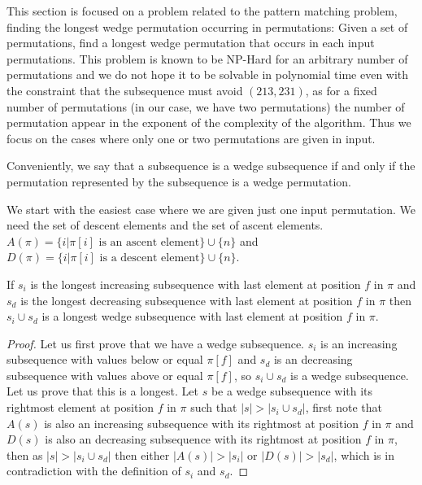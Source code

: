\documentclass[a4paper]{llncs}
\newcounter{num}
\begin{document}
This section is focused on a problem related to the pattern matching problem, finding the longest wedge permutation occurring in permutations:
Given a set of permutations, find a longest wedge permutation that occurs in
each input permutations.
This problem is known to be NP-Hard for an arbitrary number of permutations and we do not hope it to be solvable in polynomial time even with the constraint that the subsequence must avoid $(213,231)$, as for a fixed number of permutations
(in our case, we have two permutations) the number of permutation appear in the exponent of the complexity of the algorithm.
Thus we focus on the cases where only one or two permutations are given in input.

Conveniently, we say that a subsequence is
a wedge subsequence if and only if the permutation represented by the subsequence
is a wedge permutation. 

We start with the easiest case where we are given just one input permutation.
We need the set of descent elements and the set of ascent elements.
$A(\pi) = \{i | \text{$\pi[i]$ is an ascent element} \} \cup \{n\}$ and
$D(\pi) = \{i | \text{$\pi[i]$ is a descent element} \} \cup \{n\}$.\\


\begin{proposition}
\label{proposition:longestIncreasingSubsequence}
If $s_i$ is the longest increasing subsequence with last element at position $f$ in $\pi$
and $s_d$ is the longest decreasing subsequence with last element at position $f$ in $\pi$
then $s_i \cup s_d$ is a longest wedge subsequence with last element at position $f$ in $\pi$.
\end{proposition}

\begin{proof}
Let us first prove that we have a wedge subsequence.
$s_i$ is an increasing subsequence with values below or equal $\pi[f]$ and
$s_d$ is an decreasing subsequence with values above or equal $\pi[f]$,
so $s_i \cup s_d$ is a wedge subsequence.
Let us prove that this is a longest.
Let $s$ be a wedge subsequence with its rightmost element at position $f$ in $\pi$ such
that $|s|>|s_i \cup s_d|$,
first note that $A(s)$ is also an increasing subsequence with its rightmost  at position $f$ in $\pi$
and $D(s)$ is also an decreasing subsequence with its rightmost  at position $f$ in $\pi$,
then as $|s|>|s_i \cup s_d|$ then either $|A(s)| > |s_i|$ or $|D(s)| > |s_d|$,
which is in contradiction with the definition of $s_i$ and $s_d$. 
\end{proof}
\end{document}
